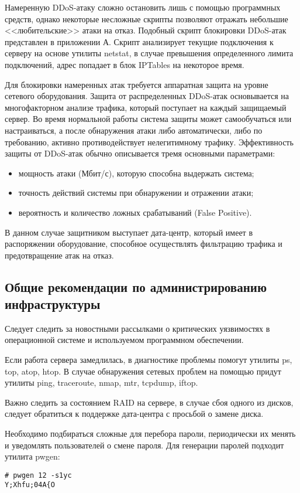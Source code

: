 Намеренную DDoS-атаку сложно остановить лишь с помощью программных средств, однако некоторые несложные скрипты позволяют отражать небольшие <<любительские>> атаки на отказ.
Подобный скрипт блокировки DDoS-атак представлен в приложении А.
Скрипт анализирует текущие подключения к серверу на основе утилиты netstat, в случае превышения определенного лимита подключений, адрес попадает в блок IPTables на некоторое время.

Для блокировки намеренных атак требуется аппаратная защита на уровне сетевого оборудования.
Защита от распределенных DDoS-атак основывается на мно­го­фак­тор­ном анализе трафика, который поступает на каждый защищаемый сервер.
Во время нормальной работы система защиты может самообучаться или настраиваться, а после обнаружения атаки либо автоматически, либо по требованию, активно про­тиво­дей­ству­ет нелегитимному трафику.
Эффективность защиты от DDoS-атак обычно описывается тремя основными параметрами:
\begin{itemize}
  \item мощность атаки (Мбит/с), которую способна выдержать система;
  \item точность действий системы при обнаружении и отражении атаки;
  \item вероятность и количество ложных срабатываний (False Positive).
\end{itemize}

В данном случае защитником выступает дата-центр, который имеет в распоряжении оборудование, способное осуществлять фильтрацию трафика и предотвращение атак на отказ.

\subsection{Общие рекомендации по администрированию инфраструктуры}

Следует следить за новостными рассылками о критических уязвимостях в операционной системе и используемом программном обеспечении.

Если работа сервера замедлилась, в диагностике проблемы помогут утилиты ps, top, atop, htop.
В случае обнаружения сетевых проблем на помощью придут утилиты ping, traceroute, nmap, mtr, tcpdump, iftop.

Важно следить за состоянием RAID на сервере, в случае сбоя одного из дисков, следует обратиться к поддержке дата-центра с просьбой о замене диска.

Необходимо подбираться сложные для перебора пароли, периодически их менять и уведомлять пользователей о смене пароля.
Для генерации паролей подходит утилита pwgen:
\begin{lstlisting}
# pwgen 12 -s1yc
Y;Xhfu;04A{O
\end{lstlisting}

